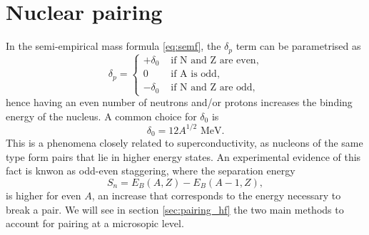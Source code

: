 \section{Nuclear pairing}
\label{sec:pairing_intro}
In the semi-empirical mass formula \eqref{eq:semf}, the $\delta_p$ term can be parametrised as 
\begin{equation}
    \delta_p = \begin{cases}
        +\delta_0 & \text{ if N and Z are even}, \\
        0 & \text{ if A is odd}, \\
        -\delta_0 & \text{ if N and Z are odd},
    \end{cases}
\end{equation}
hence having an even number of neutrons and/or protons increases the binding energy of the nucleus. A common choice for $\delta_0$ is
\begin{equation*}
\delta_0 = 12 A^{1/2}\text{ MeV}.
\end{equation*}
This is a phenomena closely related to superconductivity, as nucleons of the same type form pairs that lie in higher energy states. An experimental evidence of this fact is knwon as odd-even staggering, where the separation energy
\begin{equation}
    S_n = E_B(A, Z) - E_B(A-1, Z),
\end{equation}
is higher for even $A$, an increase that corresponds to the energy necessary to break a pair. We will see in section \ref{sec:pairing_hf} the two main methods to account for pairing at a microsopic level.


